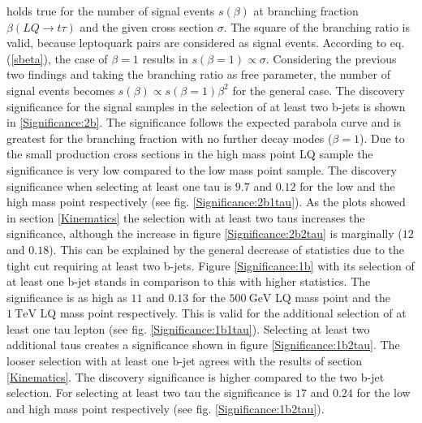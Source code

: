 %
holds true for the number of signal events $s(\beta)$ at branching fraction $\beta(LQ\rightarrow t\tau)$ and the given cross section $\sigma$. The square of the branching ratio is valid, because leptoquark pairs are considered as signal events. According to eq. (\ref{sbeta}), the case of $\beta=1$ results in $s(\beta=1)\propto\sigma$. Considering the previous two findings and taking the branching ratio as free parameter, the number of signal events becomes $s(\beta)\propto s(\beta=1)\beta^2$ for the general case.\newline
The discovery significance for the signal samples in the selection of at least two b-jets is shown in \ref{Significance:2b}. The significance follows the expected parabola curve and is greatest for the branching fraction with no further decay modes ($\beta=1$). Due to the small production cross sections in the high mass point LQ sample the significance is very low compared to the low mass point sample. The discovery significance when selecting at least one tau is $9.7$ and $0.12$ for the low and the high mass point respectively (see fig. \ref{Significance:2b1tau}). As the plots showed in section \ref{Kinematics} the selection with at least two taus increases the significance, although the increase in figure \ref{Significance:2b2tau} is marginally ($12$ and $0.18$). This can be explained by the general decrease of statistics due to the tight cut requiring at least two b-jets. Figure \ref{Significance:1b} with its selection of at least one b-jet stands in comparison to this with higher statistics. The significance is as high as $11$ and $0.13$ for the $\SI{500}{\giga\electronvolt}$ LQ mass point and the $\SI{1}{\tera\electronvolt}$ LQ mass point respectively. This is valid for the additional selection of at least one tau lepton (see fig. \ref{Significance:1b1tau}). Selecting at least two additional taus creates a significance shown in figure \ref{Significance:1b2tau}. The looser selection with at least one b-jet agrees with the results of section \ref{Kinematics}. The discovery significance is higher compared to the two b-jet selection. For selecting at least two tau the significance is $17$ and $0.24$ for the low and high mass point respectively (see fig. \ref{Significance:1b2tau}).\newline
%
